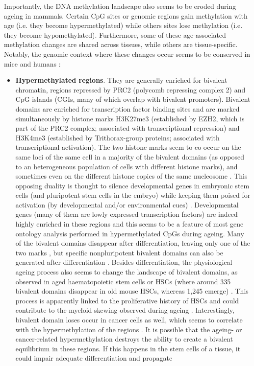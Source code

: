 Importantly, the DNA methylation landscape also seems to be eroded during ageing in mammals. Certain CpG sites or genomic regions gain methylation with age (i.e. they become hypermethylated) while others sites lose methylation (i.e. they become hypomethylated). Furthermore, some of these age-associated methylation changes are shared across tissues, while others are tissue-specific. Notably, the genomic context where these changes occur seems to be conserved in mice \cite{Maegawa2010,Avrahami2015,Wang2017,Cole2017} and humans \cite{Rakyan2010,Teschendorff2010,Horvath2012,Heyn2012,Day2013,Raddatz2013,Weidner2014,Fernandez2015,Dozmorov2015,Yuan2015,Slieker2016,Slieker2018,Zhu2018}:

\begin{itemize}
	
	\item \textbf{Hypermethylated regions}. They are generally enriched for bivalent chromatin, regions repressed by \acrshort{PRC2} (polycomb repressing complex 2) and CpG islands (\acrshort{CGI}s, many of which overlap with bivalent promoters). Bivalent domains are enriched for transcription factor binding sites and are marked simultaneously by histone marks H3K27me3 (established by EZH2, which is part of the PRC2 complex; associated with transcriptional repression) and H3K4me3 (established by Trithorax-group proteins; associated with transcriptional activation). The two histone marks seem to co-occur on the same loci of the same cell in a majority of the bivalent domains (as opposed to an heterogeneous population of cells with different histone marks), and sometimes even on the different histone copies of the same nucleosome \cite{Voigt2013}. This opposing duality is thought to silence developmental genes in embryonic stem cells (and pluripotent stem cells in the embryo) while keeping them poised for activation (by developmental and/or environmental cues) \cite{Voigt2013}. Developmental genes (many of them are lowly expressed transcription factors) are indeed highly enriched in these regions and this seems to be a feature of most gene ontology analysis performed in hypermethylated CpGs during ageing. Many of the bivalent domains disappear after differentiation, leaving only one of the two marks \cite{Bernstein2006}, but specific nonpluripotent bivalent domains can also be generated after differentiation \cite{Voigt2013}. Besides differentiation, the physiological ageing process also seems to change the landscape of bivalent domains, as observed in aged haematopoietic stem cells or \acrshort{HSCs} (where around 335 bivalent domains disappear in old mouse HSCs, whereas 1,245 emerge) \cite{Sun2014}. This process is apparently linked to the proliferative history of \acrshort{HSCs} \cite{Beerman2013} and could contribute to the myeloid skewing observed during ageing \cite{Sun2014,Beerman2013}. Interestingly, bivalent domain loses occur in cancer cells as well, which seems to correlate with the hypermethylation of the regions \cite{Bernhart2016}. It is possible that the ageing- or cancer-related hypermethylation destroys the ability to create a bivalent equilibrium in these regions. If this happens in the stem cells of a tissue, it could impair adequate differentiation and propagate 
\end{itemize}
